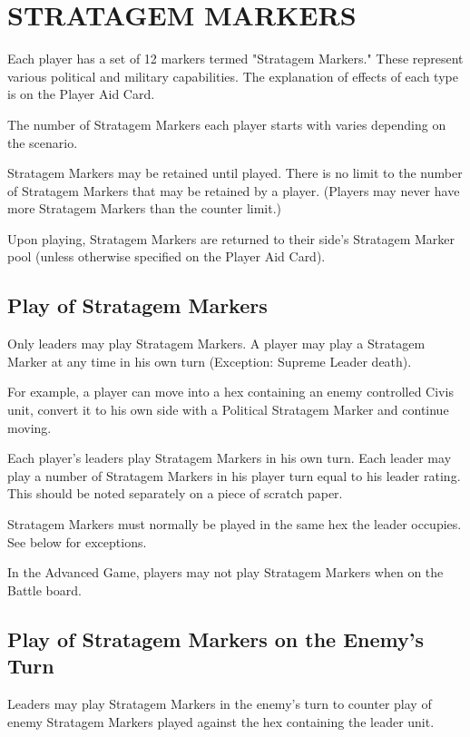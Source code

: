 \section{STRATAGEM MARKERS}

Each player has a set of 12 markers termed "Stratagem Markers." These represent various political and military capabilities. The explanation of effects of each type is on the Player Aid Card.

The number of Stratagem Markers each player starts with varies depending on the scenario.

Stratagem Markers may be retained until played. There is no limit to the number of Stratagem Markers that may be retained by a player. (Players may never have more Stratagem Markers than the counter limit.)

Upon playing, Stratagem Markers are returned to their side's Stratagem Marker pool (unless otherwise specified on the Player Aid Card).

\subsection{Play of Stratagem Markers}

Only leaders may play Stratagem Markers. A player may play a Stratagem Marker at any time in his own turn (Exception: Supreme Leader death).

For example, a player can move into a hex containing an enemy controlled Civis unit, convert it to his own side with a Political Stratagem Marker and continue moving.

Each player's leaders play Stratagem Markers in his own turn. Each leader may play a number of Stratagem Markers in his player turn equal to his leader rating. This should be noted separately on a piece of scratch paper.

Stratagem Markers must normally be played in the same hex the leader occupies. See below for exceptions.

In the Advanced Game, players may not play Stratagem Markers when on the Battle board.

\subsection{Play of Stratagem Markers on the Enemy’s Turn}

Leaders may play Stratagem Markers in the enemy's turn to counter play of enemy Stratagem Markers played against the hex containing the leader unit.

